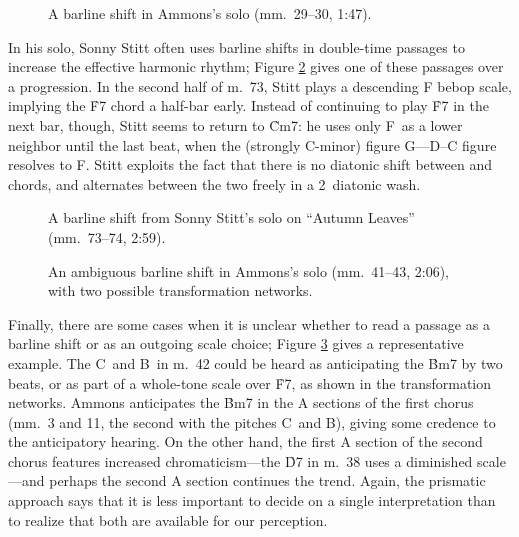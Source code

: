 \begin{figure}[tbp]
  \caption[A barline shift from Ammons's solo.]{A barline shift in Ammons's
    solo (mm.~29--30, 1:47).}
  \label{csa:metric-delay}
\end{figure}

In his solo, Sonny Stitt often uses barline shifts in double-time passages to
increase the effective harmonic rhythm; Figure \ref{csa:stitt-double-time}
gives one of these passages over a \tf progression. In the second
half of m.~73, Stitt plays a descending F bebop scale, implying the \h{F7}
chord a half-bar early. Instead of continuing to play \h{F7} in the
next bar, though, Stitt seems to return to \h{Cm7}: he uses only F\sharp\ as a
lower neighbor until the last beat, when the (strongly C-minor) figure
G--\Eflat--D--C figure resolves to F\nat. Stitt exploits the fact that there
is no diatonic shift between \ii and \V chords, and alternates between the
two freely in a 2\flat\ diatonic wash.

\begin{figure}[tbp]
  \caption[A barline shift from Sonny Stitt's solo on ``Autumn Leaves.'']{A
    barline shift from Sonny Stitt's solo on ``Autumn Leaves'' (mm.~73--74,
    2:59).}
  \label{csa:stitt-double-time}
\end{figure}

\begin{figure}[tbp]
  \caption[An ambiguous barline shift in Ammon's solo, with two possible
  transformation networks.]{An ambiguous barline shift in Ammons's
  solo (mm.~41--43, 2:06), with two possible transformation networks.}
  \label{csa:metric-parsing}
\end{figure}

Finally, there are some cases when it is unclear whether to read a passage as
a barline shift or as an outgoing scale choice; Figure
\ref{csa:metric-parsing} gives a representative example. The
C\sharp\ and B\nat\ in m.~42 could be heard as anticipating the \h{Bm7} by two
beats, or as part of a whole-tone scale over \h{F7}, as shown in the
transformation networks. Ammons anticipates the \h{Bm7} in the A sections of
the first chorus (mm.~3 and 11, the second with the pitches C\sharp\ and
B\nat), giving some credence to the anticipatory hearing. On the other hand,
the first A section of the second chorus features increased chromaticism---the
\h{D7} in m.~38 uses a diminished scale---and perhaps the second A section
continues the trend. Again, the prismatic approach says that it is less
important to decide on a single interpretation than to realize that both
are available for our perception.


